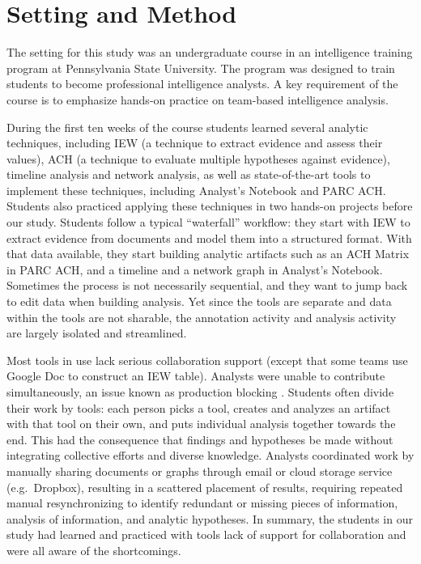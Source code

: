 \section{Setting and Method}\label{classroom-study-settings}

The setting for this study was an undergraduate course in an intelligence
training program at Pennsylvania State University. The program was designed to train students
to become professional intelligence analysts. A key requirement of the course is
to emphasize hands-on practice on team-based intelligence analysis.


 During the first ten weeks of the course
 students learned several analytic techniques, including IEW (a technique
 to extract evidence and assess their values), ACH (a technique to evaluate
 multiple hypotheses against evidence), timeline analysis and network
 analysis, as well as state-of-the-art tools to implement these
 techniques, including Analyst's Notebook and PARC ACH. Students also practiced applying these
 techniques in two hands-on projects before our study. Students follow a typical ``waterfall'' workflow: they start with IEW to
 extract evidence from documents and model them into a structured format. With that data available, they start building analytic
 artifacts such as an ACH Matrix in PARC ACH, and a timeline and a network
 graph in Analyst's Notebook. Sometimes the process is not necessarily sequential, and they want to jump back to edit data when building analysis. Yet since the tools are separate and data within the tools are not sharable, the annotation activity and analysis activity are largely isolated and streamlined. 
 
 Most tools in use lack serious collaboration
 support (except that some teams use Google Doc to construct an IEW
 table). Analysts were unable to contribute simultaneously, an issue
 known as production blocking \citep{Diehl1987a}. Students often divide their work by tools: each person picks a tool, creates and analyzes an artifact
 with that tool on their own, and puts individual analysis together towards the end. This had the consequence that findings and
 hypotheses be made without integrating collective efforts and diverse
 knowledge. Analysts coordinated work by manually sharing documents
 or graphs through email or cloud storage service (e.g.~Dropbox),
 resulting in a scattered placement of results, requiring repeated manual
 resynchronizing to identify redundant or missing pieces of information,
 analysis of information, and analytic hypotheses. In summary, the students in our study had learned and practiced with tools lack of support for collaboration and were all aware of the shortcomings.

